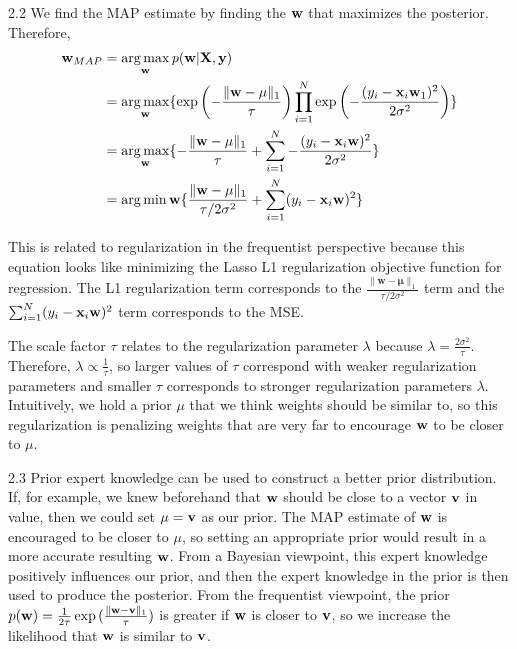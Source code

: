 \documentclass[submit]{harvardml}
\DeclareMathOperator*{\argmax}{arg\,max}
\DeclareMathOperator*{\argmin}{arg\,min}
\begin{document}
2.2 We find the MAP estimate by finding the $\bold{w}$ that maximizes the posterior. Therefore, 
\begin{align*}
    \bold{w}_{MAP} &= \argmax_{\bold{w}} p(\bold{w}|\bold{X}, \bold{y}) \\
    &= \argmax_{\bold{w}} \{ \exp\left(-\frac{\|\mathbf{w}-\mathbf{\mu}\|_1}{\tau}\right) \prod_{i=1}^N \exp \left(-\frac{(y_i - \bold{x}_i \bold{w}_1)^2}{2\sigma^2} \right) \}\\
    &= \argmax_{\bold{w}} \{-\frac{\|\mathbf{w}-\mathbf{\mu}\|_1}{\tau} + \sum_{i=1}^N -\frac{(y_i - \bold{x}_i \bold{w})^2}{2\sigma^2} \}\\
    &= \argmin{\bold{w}} \{ \frac{\|\mathbf{w}-\mathbf{\mu}\|_1}{\tau/2\sigma^2} + \sum_{i=1}^N (y_i - \bold{x}_i\bold{w})^2\}
\end{align*}

This is related to regularization in the frequentist perspective because this equation looks like minimizing the Lasso L1 regularization objective function for regression. The L1 regularization term corresponds to the $\frac{\|\mathbf{w}-\mathbf{\mu}\|_1}{\tau/2\sigma^2}$ term and the $\sum_{i=1}^N (y_i - \bold{x}_i\bold{w})^2$ term corresponds to the MSE.

The scale factor $\tau$ relates to the regularization parameter $\lambda$ because $\lambda = \frac{2\sigma^2}{\tau}$. Therefore, $\lambda \propto \frac{1}{\tau}$, so larger values of $\tau$ correspond with weaker regularization parameters and smaller $\tau$ corresponds to stronger regularization parameters $\lambda$. Intuitively, we hold a prior $\mu$ that we think weights should be similar to, so this regularization is penalizing weights that are very far to encourage $\bold{w}$ to be closer to $\mu$.

2.3 Prior expert knowledge can be used to construct a better prior distribution. If, for example, we knew beforehand that $\bold{w}$ should be close to a vector $\bold{v}$ in value, then we could set $\mu = \bold{v}$ as our prior. The MAP estimate of $\bold{w}$ is encouraged to be closer to $\mu$, so setting an appropriate prior would result in a more accurate resulting $\bold{w}$. From a Bayesian viewpoint, this expert knowledge positively influences our prior, and then the expert knowledge in the prior is then used to produce the posterior. From the frequentist viewpoint, the prior $p(\bold{w}) =\frac{1}{2\tau} \exp{( \frac{\|\mathbf{w}-\mathbf{v}\|_1}{\tau})}$ is greater if $\bold{w}$ is closer to $\bold{v}$, so we increase the likelihood that $\bold{w}$ is similar to $\bold{v}$.
\end{document}
